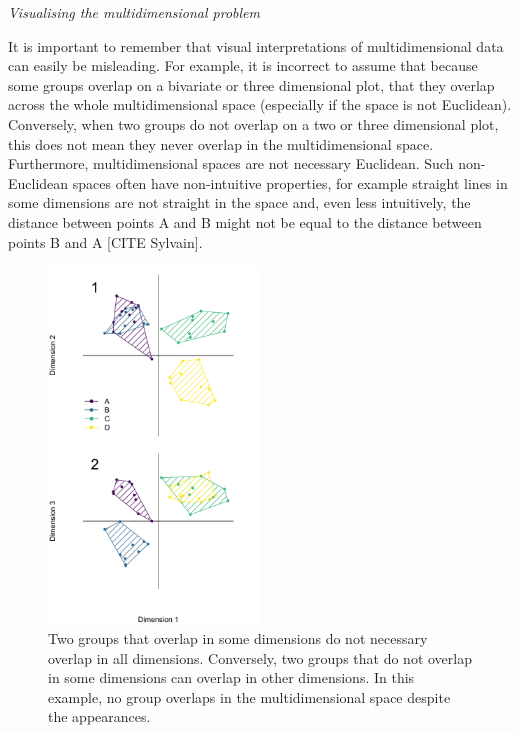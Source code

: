 \documentclass[12pt,letterpaper]{article}
\renewcommand{\subsection}[1]{%
\bigskip
\begin{center}
\begin{large}
\normalfont\itshape #1
\end{large}
\end{center}}
\begin{document}
\subsection{Visualising the multidimensional problem}
\label{visualisation}
It is important to remember that visual interpretations of multidimensional data can easily be misleading.
For example, it is incorrect to assume that because some groups overlap on a bivariate or three dimensional plot, that they overlap across the whole multidimensional space (especially if the space is not Euclidean).
Conversely, when two groups do not overlap on a two or three dimensional plot, this does not mean they never overlap in the multidimensional space.
Furthermore, multidimensional spaces are not necessary Euclidean.
Such non-Euclidean spaces often have non-intuitive properties, for example straight lines in some dimensions are not straight in the space and, even less intuitively, the distance between points A and B might not be equal to the distance between points B and A [CITE Sylvain].

\begin{figure}[!htbp]
\centering
   \includegraphics[width=0.5\textwidth]{Figures/dimensionsOverlap.pdf}
\caption{\small{Two groups that overlap in some dimensions do not necessary overlap in all dimensions. 
Conversely, two groups that do not overlap in some dimensions can overlap in other dimensions. 
In this example, no group overlaps in the multidimensional space despite the appearances.}} 
\label{Fig:RF_results_best}
\end{figure}
\end{document}
